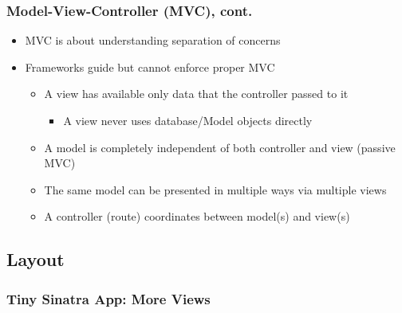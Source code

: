 \documentclass{beamer}
\begin{document}
\begin{frame}[fragile]\frametitle{Model-View-Controller (MVC), cont.}

  \begin{itemize}
  
    \item MVC is about understanding separation of concerns
    \item Frameworks guide but cannot enforce proper MVC
    \begin{itemize}
      \item A view has available only data that the controller passed to it
      \begin{itemize}
        \item A view never uses database/Model objects directly
      \end{itemize}
      \item A model is completely independent of both controller and view (passive MVC)
      \item The same model can be presented in multiple ways via multiple views
      \item A controller (route) coordinates between model(s) and view(s)
    \end{itemize}

  \end{itemize}

\end{frame}




\subsection{Layout}
\begin{frame}[fragile]\frametitle{Tiny Sinatra App: More Views}
  
  

  
  
\end{frame}
\end{document}
